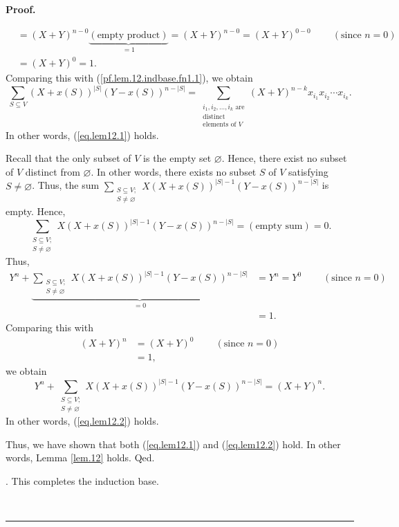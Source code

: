 \documentclass[numbers=enddot,12pt,final,onecolumn,notitlepage]{scrartcl}%
\theoremstyle{definition}
\newenvironment{proof}[1][Proof]{\noindent\textbf{#1.} }{\ \rule{0.5em}{0.5em}}
\let\sumnonlimits\sum
\renewcommand{\sum}{\sumnonlimits\limits}
\newenvironment{verlong}{}{}
\begin{document}
\begin{verlong}
\begin{proof}
{\begin{align*}
&  =\left(  X+Y\right)  ^{n-0}\underbrace{\left(  \text{empty product}\right)
}_{=1}=\left(  X+Y\right)  ^{n-0}=\left(  X+Y\right)  ^{0-0}%
\ \ \ \ \ \ \ \ \ \ \left(  \text{since }n=0\right) \\
&  =\left(  X+Y\right)  ^{0}=1.
\end{align*}
Comparing this with (\ref{pf.lem.12.indbase.fn1.1}), we obtain
\begin{equation}
\sum_{S\subseteq V}\left(  X+x\left(  S\right)  \right)  ^{\left\vert
S\right\vert }\left(  Y-x\left(  S\right)  \right)  ^{n-\left\vert
S\right\vert }=\sum_{\substack{i_{1},i_{2},\ldots,i_{k}\text{ are}%
\\\text{distinct}\\\text{elements of }V}}\left(  X+Y\right)  ^{n-k}x_{i_{1}%
}x_{i_{2}}\cdots x_{i_{k}}.\nonumber
\end{equation}
In other words, (\ref{eq.lem12.1}) holds.
\par
Recall that the only subset of $V$ is the empty set $\varnothing$. Hence,
there exist no subset of $V$ distinct from $\varnothing$. In other words,
there exists no subset $S$ of $V$ satisfying $S\neq\varnothing$. Thus, the sum
$\sum_{\substack{S\subseteq V;\\S\neq\varnothing}}X\left(  X+x\left(
S\right)  \right)  ^{\left\vert S\right\vert -1}\left(  Y-x\left(  S\right)
\right)  ^{n-\left\vert S\right\vert }$ is empty. Hence,%
\[
\sum_{\substack{S\subseteq V;\\S\neq\varnothing}}X\left(  X+x\left(  S\right)
\right)  ^{\left\vert S\right\vert -1}\left(  Y-x\left(  S\right)  \right)
^{n-\left\vert S\right\vert }=\left(  \text{empty sum}\right)  =0.
\]
Thus,%
\begin{align*}
Y^{n}+\underbrace{\sum_{\substack{S\subseteq V;\\S\neq\varnothing}}X\left(
X+x\left(  S\right)  \right)  ^{\left\vert S\right\vert -1}\left(  Y-x\left(
S\right)  \right)  ^{n-\left\vert S\right\vert }}_{=0}  &  =Y^{n}%
=Y^{0}\ \ \ \ \ \ \ \ \ \ \left(  \text{since }n=0\right) \\
&  =1.
\end{align*}
Comparing this with%
\begin{align*}
\left(  X+Y\right)  ^{n}  &  =\left(  X+Y\right)  ^{0}%
\ \ \ \ \ \ \ \ \ \ \left(  \text{since }n=0\right) \\
&  =1,
\end{align*}
we obtain%
\[
Y^{n}+\sum_{\substack{S\subseteq V;\\S\neq\varnothing}}X\left(  X+x\left(
S\right)  \right)  ^{\left\vert S\right\vert -1}\left(  Y-x\left(  S\right)
\right)  ^{n-\left\vert S\right\vert }=\left(  X+Y\right)  ^{n}.
\]
In other words, (\ref{eq.lem12.2}) holds.
\par
Thus, we have shown that both (\ref{eq.lem12.1}) and (\ref{eq.lem12.2}) hold.
In other words, Lemma \ref{lem.12} holds. Qed.}. This completes the induction base.


\end{proof}
\end{verlong}
\end{document}
